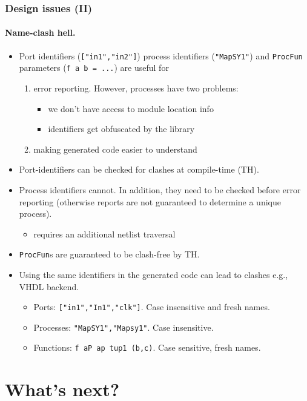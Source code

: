 \documentclass{beamer}
\begin{document}
\begin{frame}
  \frametitle{Design issues (II)}
  \framesubtitle{Name-clash hell.}
  \begin{itemize}
  \item Port identifiers (\texttt{["in1","in2"]}) process
    identifiers  (\texttt{"MapSY1"}) and \texttt{ProcFun} parameters
    (\texttt{f a b = ...}) are useful for 
    \begin{enumerate}
    \item error reporting. However, processes have two problems:
      \begin{itemize}
        \item \alert{we don't have access to module location info}
        \item \alert{identifiers get obfuscated by the library}
      \end{itemize}
    \item making generated code easier to understand
    \end{enumerate}
  \item Port-identifiers can be checked for clashes at compile-time
    (TH).
  \item Process identifiers cannot. In addition, they need to be checked
    before error reporting (otherwise reports are not
    guaranteed to determine a unique process).
    \begin{itemize}
    \item \alert{requires an additional netlist traversal}
    \end{itemize}
 \item \texttt{ProcFun}s are guaranteed to be clash-free by TH.
 \item \alert{Using the same identifiers in the generated code can lead to clashes}
   e.g., VHDL backend.
   \begin{itemize}
   \item Ports: \texttt{["in1","In1","clk"]}. Case insensitive and 
        fresh names.
      \item Processes: \texttt{"MapSY1","Mapsy1"}. Case insensitive.
      \item Functions: \texttt{f aP ap tup1 (b,c)}. Case sensitive, fresh names.
      \end{itemize}
    \end{itemize}
\end{frame}

\beamerdefaultoverlayspecification{}
\section{What's next?}
\end{document}
